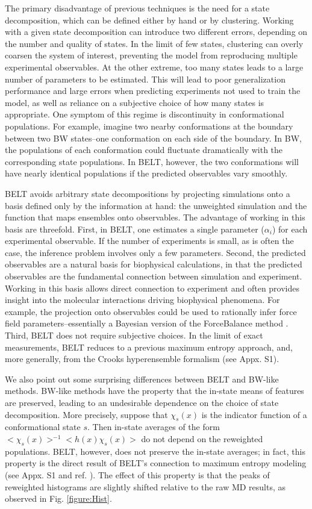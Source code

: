 \documentclass[journal=jacsat,manuscript=article]{achemso}
\begin{document}
The primary disadvantage of previous techniques is the need for a state decomposition, which can be defined either by hand or by clustering.  Working with a given state decomposition can introduce two different errors, depending on the number  and quality of states.  In the limit of few states, clustering can overly coarsen the system of interest, preventing the model from reproducing multiple experimental observables.  At the other extreme, too many states leads to a large number of parameters to be estimated. This will lead to poor generalization performance and large errors when predicting experiments not used to train the model, as well as reliance on a subjective choice of how many states is appropriate.  One symptom of this regime is discontinuity in conformational populations. For example, imagine two nearby conformations at the boundary between two BW states--one conformation on each side of the boundary.  In BW, the populations of each conformation could fluctuate dramatically with the 
corresponding 
state populations.  In BELT, however, the two conformations will have nearly identical populations if the predicted observables vary smoothly.

BELT avoids arbitrary state decompositions by projecting simulations onto a basis defined only by the information at hand: the unweighted simulation and the function that maps ensembles onto observables.  The advantage of working in this basis are threefold. First, in BELT, one estimates a single parameter ($\alpha_i$) for each experimental observable.  If the number of experiments is small, as is often the case, the inference problem involves only a few parameters.  Second, the predicted observables are a natural basis for biophysical calculations, in that the predicted observables are the fundamental connection between simulation and experiment.  Working in this basis allows direct connection to experiment and often provides insight into the molecular interactions driving biophysical phenomena.  For example, the projection onto observables could be used to rationally infer force field parameters--essentially a Bayesian version of the ForceBalance method  \cite{wang2012, wang2013systematic}.  Third, BELT does not require subjective choices.  In the limit of exact measurements, BELT reduces to a previous  \cite{chodera2012} maximum entropy approach, and, more generally, from the Crooks hyperensemble formalism (see Appx. S1).  

We also point out some surprising differences between BELT and BW-like methods.  BW-like methods have the property that the in-state means of features are preserved, leading to an undesirable dependence on the choice of state decomposition.  More precisely, suppose that $\chi_s(x)$ is the indicator function of a conformational state $s$.  Then in-state averages of the form $<\chi_s(x)>^{-1} <h(x) \chi_s(x)>$ do not depend on the reweighted populations.  BELT, however, does not preserve the in-state averages; in fact, this property is the direct result of BELT's connection to maximum entropy modeling (see Appx. S1 and ref.  \cite{chodera2012}).  The effect of this property is that the peaks of reweighted histograms are slightly shifted relative to the raw MD results, as observed in Fig. \ref{figure:Hist}.   
\end{document}
